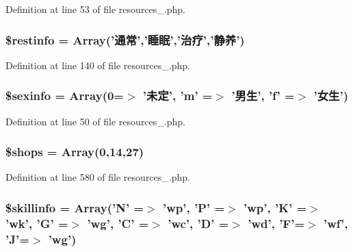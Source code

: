 Definition at line 53 of file resources\+\_.\+php.

\hypertarget{resources__1_8php_a9eadda2ba19f193cb5b6d373f4ec6e00}{
\subsubsection[{\$restinfo}]{\setlength{\rightskip}{0pt plus 5cm}\$restinfo = Array('通常','睡眠','治疗','静养')}}\label{resources__1_8php_a9eadda2ba19f193cb5b6d373f4ec6e00}


Definition at line 140 of file resources\+\_.\+php.

\hypertarget{resources__1_8php_a7fc213b5009edd4913f9a3f66776c721}{
\subsubsection[{\$sexinfo}]{\setlength{\rightskip}{0pt plus 5cm}\$sexinfo = Array(0=$>$ '未定', 'm' =$>$ '男生', 'f' =$>$ '女生')}}\label{resources__1_8php_a7fc213b5009edd4913f9a3f66776c721}


Definition at line 50 of file resources\+\_.\+php.

\hypertarget{resources__1_8php_a6a4f6f4fa7edf238e168beb18f0870af}{
\subsubsection[{\$shops}]{\setlength{\rightskip}{0pt plus 5cm}\$shops = Array(0,14,27)}}\label{resources__1_8php_a6a4f6f4fa7edf238e168beb18f0870af}


Definition at line 580 of file resources\+\_.\+php.

\hypertarget{resources__1_8php_a94b9a3413b45767e103c4f7ad2346921}{
\subsubsection[{\$skillinfo}]{\setlength{\rightskip}{0pt plus 5cm}\$skillinfo = Array('N' =$>$ 'wp', 'P' =$>$ 'wp', 'K' =$>$ 'wk', 'G' =$>$ 'wg', 'C' =$>$ 'wc', 'D' =$>$ 'wd', 'F'=$>$ 'wf', 'J'=$>$ 'wg')}}\label{resources__1_8php_a94b9a3413b45767e103c4f7ad2346921}


